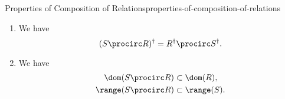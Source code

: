 \begin{proposition}{Properties of Composition of Relations}{properties-of-composition-of-relations}
\begin{enumerate}
            for each $a\in A$.
        \item\label{properties-of-composition-of-relations-interaction-with-converses}We have
            \[
                (S\procirc R)^{\dagger}
                =
                R^{\dagger}\procirc S^{\dagger}.
            \]%
        \item\label{properties-of-composition-of-relations-interaction-with-ranges-and-domains}We have
            \begin{align*}
                \dom(S\procirc R)   &\subset \dom(R),\\
                \range(S\procirc R) &\subset \range(S).
            \end{align*}
    \end{enumerate}
\end{proposition}
